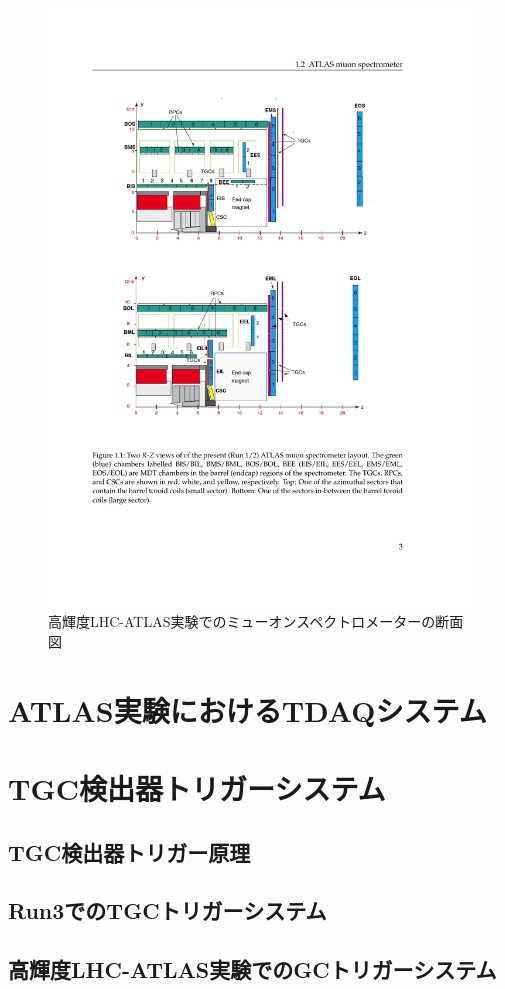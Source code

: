 \begin{figure} 
    \centering
    \includegraphics[width=16cm]{fig/Intro/Muonspectrometer.pdf}
    \caption[高輝度LHC-ATLAS実験でのミューオンスペクトロメーターの断面図]{高輝度LHC-ATLAS実験でのミューオンスペクトロメーターの断面図\cite{tdr_phase2muon_2017017}}
    \label{Muonspectrometer}
\end{figure}
    


\section{ATLAS実験におけるTDAQシステム}
\label{sec_TDAQ}

\section{TGC検出器トリガーシステム}
\label{sec_TGCtrigger}

\subsection{TGC検出器トリガー原理}
\label{subsec_TGCtriprinciple}

\subsection{Run3でのTGCトリガーシステム}
\label{subsec_run3trig}

\subsection{高輝度LHC-ATLAS実験でのGCトリガーシステム}







